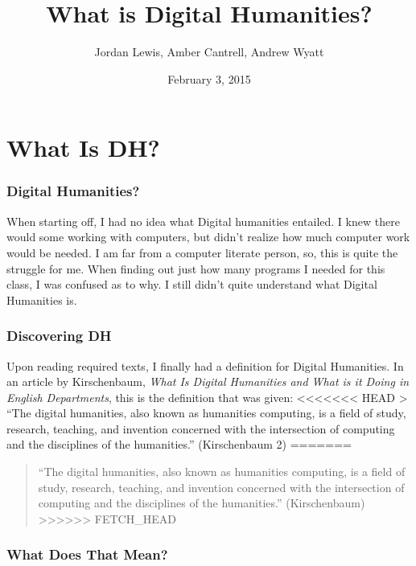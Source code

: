 \documentclass[]{article}
\title{What is Digital Humanities?}
\author{Jordan Lewis, Amber Cantrell, Andrew Wyatt}
\date{February 3, 2015}
\begin{document}
\maketitle

\section{What Is DH?}\label{what-is-dh}

\subsubsection{Digital Humanities?}\label{digital-humanities}

When starting off, I had no idea what Digital humanities entailed. I
knew there would some working with computers, but didn't realize how
much computer work would be needed. I am far from a computer literate
person, so, this is quite the struggle for me. When finding out just how
many programs I needed for this class, I was confused as to why. I still
didn't quite understand what Digital Humanities is.

\subsubsection{Discovering DH}\label{discovering-dh}

Upon reading required texts, I finally had a definition for Digital
Humanities. In an article by Kirschenbaum, \emph{What Is Digital
Humanities and What is it Doing in English Departments}, this is the
definition that was given:
\textless{}\textless{}\textless{}\textless{}\textless{}\textless{}\textless{}
HEAD \textgreater{} ``The digital humanities, also known as humanities
computing, is a field of study, research, teaching, and invention
concerned with the intersection of computing and the disciplines of the
humanities.'' (Kirschenbaum 2) =======

\begin{quote}
``The digital humanities, also known as humanities computing, is a field
of study, research, teaching, and invention concerned with the
intersection of computing and the disciplines of the humanities.''
(Kirschenbaum)
\textgreater{}\textgreater{}\textgreater{}\textgreater{}\textgreater{}\textgreater{}
FETCH\_HEAD
\end{quote}

\subsubsection{What Does That Mean?}\label{what-does-that-mean}
\end{document}
